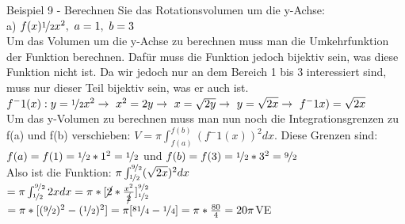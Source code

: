\documentclass{article}
\begin{document}
	Beispiel 9 - Berechnen Sie das Rotationsvolumen um die y-Achse: \\
	a) $f(x)\nicefrac{1}{2}x^2,\ a=1,\ b=3$ \\
	Um das Volumen um die y-Achse zu berechnen muss man die Umkehrfunktion der Funktion berechnen. Dafür muss die Funktion jedoch bijektiv sein, was diese Funktion nicht ist. Da wir jedoch nur an dem Bereich 1 bis 3 interessiert sind, muss nur dieser Teil bijektiv sein, was er auch ist. \\
	$f^-1(x):y=\nicefrac{1}{2}x^2\to\ x^2=2y\to\ x=\sqrt{2y}\to\ y=\sqrt{2x}\to\ f^-1{x)=\sqrt{2x}}$ \\
	Um das y-Volumen zu berechnen muss man nun noch die Integrationsgrenzen zu f(a) und f(b) verschieben: $V=\pi \int_{f(a)}^{f(b)}(f^-1(x))^2dx$. Diese Grenzen sind: $f(a)=f(1)=\nicefrac{1}{2}*1^2=\nicefrac{1}{2}$ und $f(b)=f(3)=\nicefrac{1}{2}*3^2=\nicefrac{9}{2}$ \\
	Also ist die Funktion: $\pi \int_{\nicefrac{1}{2}}^{\nicefrac{9}{2}}(\sqrt{2x})^2dx$ \\
	$=\pi \int_{\nicefrac{1}{2}}^{\nicefrac{9}{2}}2xdx=\pi*[\cancel{2}*\frac{x^2}{\cancel{2}}]^{\nicefrac{9}{2}}_{\nicefrac{1}{2}}$\\
	$=\pi*[(\nicefrac{9}{2})^2-(\nicefrac{1}{2})^2]=\pi[\nicefrac{81}{4}-\nicefrac{1}{4}]=\pi*\frac{80}{4}=20\pi$VE
\end{document}
